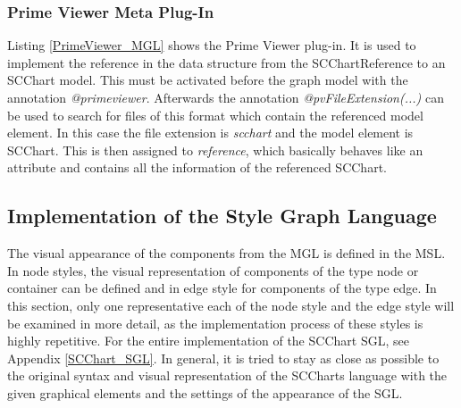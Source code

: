 \subsubsection{Prime Viewer Meta Plug-In}
Listing \ref{PrimeViewer_MGL} shows the Prime Viewer plug-in. It is used to implement the reference in the data structure from the SCChartReference to an SCChart model. This must be activated before the graph model with the annotation \textit{@primeviewer}. Afterwards the annotation \textit{@pvFileExtension(...)} can be used to search for files of this format which contain the referenced model element. In this case the file extension is \textit{scchart} and the model element is SCChart. This is then assigned to \textit{reference}, which basically behaves like an attribute and contains all the information of the referenced SCChart.


\subsection{Implementation of the Style Graph Language}
The visual appearance of the components from the MGL is defined in the MSL. In node styles, the visual representation of components of the type node or container can be defined and in edge style for components of the type edge. In this section, only one representative each of the node style and the edge style will be examined in more detail, as the implementation process of these styles is highly repetitive. For the entire implementation of the SCChart SGL, see Appendix \ref{SCChart_SGL}. In general, it is tried to stay as close as possible to the original syntax and visual representation of the SCCharts language with the given graphical elements and the settings of the appearance of the SGL.

